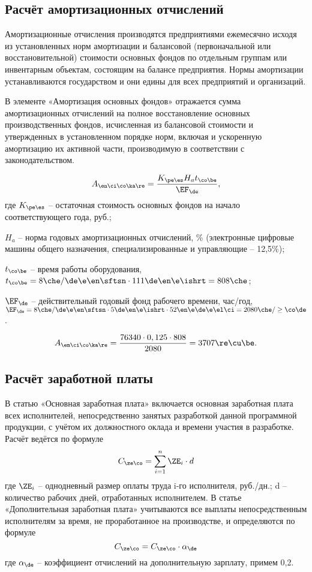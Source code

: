 \subsection{Расчёт амортизационных отчислений}
Амортизационные отчисления производятся предприятиями ежемесячно исходя из установленных норм амортизации и балансовой (первоначальной или восстановительной) стоимости основных фондов по отдельным группам или инвентарным объектам, состоящим на балансе предприятия. Нормы амортизации устанавливаются государством и они едины для всех предприятий и организаций.

В элементе «Амортизация основных фондов» отражается сумма амортизационных отчислений на полное восстановление основных производственных фондов, исчисленная из балансовой стоимости и утвержденных в установленном порядке норм, включая и ускоренную амортизацию их активной части, производимую в соответствии с законодательством.

\begin{equation*}
    A_{\en\ci\co\ka\re} = \frac{K_{\pe\es} H_a t_{\co\be}}{\EF_{\de}},
\end{equation*}
где $K_{\pe\es}$ -- остаточная стоимость основных фондов на начало соответствующего года, руб.;

$H_a$ -- норма годовых амортизационных отчислений, \% (электронные цифровые машины общего назначения, специализированные и управляющие -- 12,5\%);

$t_{\co\be}$ -- время работы оборудования, $t_{\co\be} = 8 \che / \de\e\en\sftsn \cdot 111 \de\en\e\ishrt = 808 \che$;

$\EF_{\de}$ -- действительный годовый фонд рабочего времени, час/год, $\EF_{\de} = 8 \che / \de\e\en\sftsn \cdot 5 \de\en\e\ishrt \cdot 52 \en\e\de\e\el\ci = 2080 \che / \ge\co\de$.

\begin{equation*}
    A_{\en\ci\co\ka\re} = \frac{76340 \cdot 0,125 \cdot 808}{2080} = 3707 \re\cu\be.
\end{equation*}

\subsection{Расчёт заработной платы}
В статью «Основная заработная плата» включается основная заработная плата всех исполнителей, непосредственно занятых разработкой данной программной продукции, с учётом их должностного оклада и времени участия в разработке. Расчёт ведётся по формуле 
\begin{equation*}
    C_{\ze\co} = \sum_{i=1}^{n} {\ZE_i \cdot d}
\end{equation*}
где $\ZE_i$ -- однодневный размер оплаты труда i-го исполнителя, руб./дн.; d -- количество рабочих дней, отработанных исполнителем. 
В статье «Дополнительная заработная плата» учитываются все выплаты непосредственным исполнителям за время, не проработанное на производстве, и определяются по формуле
\begin{equation*}
    C_{\ze\co} = C_{\ze\co} \cdot \alpha_{\de}
\end{equation*}
где $\alpha_{\de}$ -- коэффициент отчислений на дополнительную зарплату, примем 0,2.


